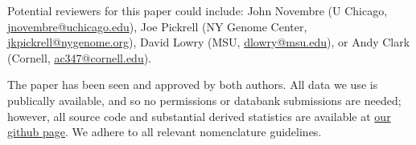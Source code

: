 \documentclass[stdletter,letterpaper,addrfromright,orderfromdateto,dateleft,11pt,noaddrto,sigleft]{newlfm}
\begin{document}
\begin{newlfm}
Potential reviewers for this paper could include:
John Novembre (U Chicago, \href{mailto:jnovembre@uchicago.edu}{jnovembre@uchicago.edu}),
Joe Pickrell (NY Genome Center, \href{mailto:jkpickrell@nygenome.org}{jkpickrell@nygenome.org}),
David Lowry (MSU, \href{mailto:dlowry@msu.edu}{dlowry@msu.edu}),
or Andy Clark (Cornell, \href{mailto:ac347@cornell.edu}{ac347@cornell.edu}).


The paper has been seen and approved by both authors.  
All data we use is publically available, and so no permissions or databank submissions are needed;
however, all source code and substantial derived statistics are available at 
\href{https://github.com/petrelharp/local_pca}{our github page}.
We adhere to all relevant nomenclature guidelines.


\end{newlfm}
\end{document}
